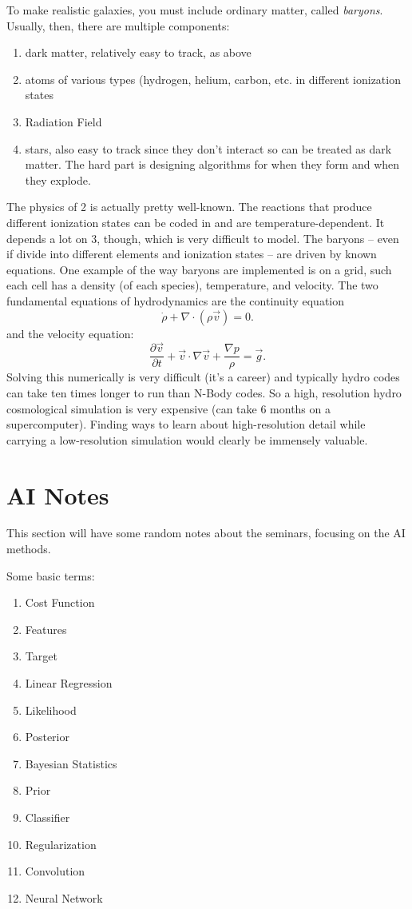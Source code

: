 \documentclass[prd,amsmath,aps,floats,amssymb, floatfix,
  superscriptaddress,nofootinbib]{revtex4-1}
\numberwithin{equation}{section}
\newcommand\be{\begin{equation}}
\newcommand\ee{\end{equation}}
\newcommand\bee{\begin{enumerate}}
\newcommand\eee{\end{enumerate}}
\begin{document}
To make realistic galaxies, you must include ordinary matter, called {\it baryons}. Usually, then, there are multiple components:
\bee
\item dark matter, relatively easy to track, as above
\item atoms of various types (hydrogen, helium, carbon, etc. in different ionization states
\item Radiation Field
\item stars, also easy to track since they don't interact so can be treated as dark matter. The hard part is designing algorithms for when they form and when they explode.
\eee
The physics of 2 is actually pretty well-known. The reactions that produce different ionization states can be coded in and are temperature-dependent. It depends a lot on 3, though, which is very difficult to model. The baryons -- even if divide into different elements and ionization states -- are driven by known equations. One example of the way baryons are implemented is on a grid, such each cell has a density (of each species), temperature, and velocity. The two fundamental equations of hydrodynamics are the continuity equation 
\be
\dot\rho + \nabla\cdot(\rho\vec v) = 0.
\ee
and the velocity equation:
\be
\frac{\partial\vec v}{\partial t} + \vec v\cdot\nabla \vec v + \frac{\nabla p}{\rho} = \vec g
.\ee
Solving this numerically is very difficult (it's a career) and typically hydro codes can take ten times longer to run than N-Body codes. So a high, resolution hydro cosmological simulation is very expensive (can take 6 months on a supercomputer). Finding ways to learn about high-resolution detail while carrying a low-resolution simulation would clearly be immensely valuable.






 
 \appendix
 
  
 \section{AI Notes}\label{sec:unblind}
 This section will have some random notes about the seminars, focusing on the AI methods. 
 
 Some basic terms:
 \bee
 \item Cost Function
 \item Features
 \item Target
 \item Linear Regression
 \item Likelihood
 \item Posterior
 \item Bayesian Statistics
 \item Prior
 \item Classifier
 \item Regularization
 \item Convolution
 \item Neural Network
  \eee
  
\end{document}
